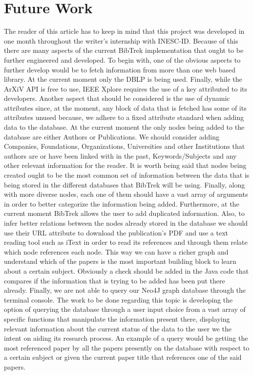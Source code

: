 \documentclass[twocolumn]{article}
\begin{document}
\section{Future Work}
The reader of this article has to keep in mind that this project was developed in one month throughout the writer's internship with INESC-ID. Because of this there are many aspects of the current BibTrek implementation that ought to be further engineered and developed. To begin with, one of the obvious aspects to further develop would be to fetch information from more than one web based library. At the current moment only the DBLP is being used. Finally, while the ArXiV API is free to use, IEEE Xplore requires the use of a key attributed to its developers. Another aspect that should be considered is the use of dynamic attributes since, at the moment, any block of data that is fetched has some of its attributes unused because, we adhere to a fixed attribute standard when adding data to the database. At the current moment the only nodes being added to the database are either Authors or Publications. We should consider adding Companies, Foundations, Organizations, Universities and other Institutions that authors are or have been linked with in the past, Keywords/Subjects and any other relevant information for the reader. It is worth being said that nodes being created ought to be the most common set of information between the data that is being stored in the different databases that BibTrek will be using. Finally, along with more diverse nodes, each one of them should have a vast array of arguments in order to better categorize the information being added. Furthermore, at the current moment BibTrek allows the user to add duplicated information. Also, to infer better relations between the nodes already stored in the database we should use their URL attribute to download the publication's PDF and use a text reading tool such as iText in order to read its references and through them relate which node references each node. This way we can have a richer graph and understand which of the papers is the most important building block to learn about a certain subject. Obviously a check should be added in the Java code that compares if the information that is trying to be added has been put there already. Finally, we are not able to query our Neo4J graph database through the terminal console. The work to be done regarding this topic is developing the option of querying the database through a user input choice from a vast array of specific functions that manipulate the information present there, displaying relevant information about the current status of the data to the user we the intent on aiding its research process. An example of a query would be getting the most referenced paper by all the papers presently on the database with respect to a certain subject or given the current paper title that references one of the said papers.
\end{document}
